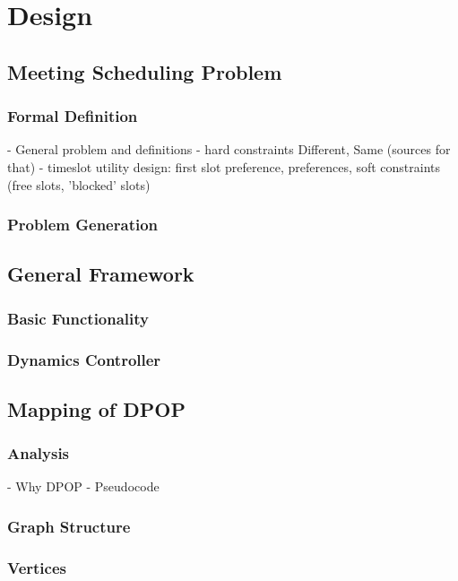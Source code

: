 \chapter{Design}

\section{Meeting Scheduling Problem}

\subsection{Formal Definition}

- General problem and definitions
- hard constraints Different, Same (sources for that)
- timeslot utility design: first slot preference, preferences, soft constraints (free slots, 'blocked' slots)

\subsection{Problem Generation}

\section{General Framework}
\subsection{Basic Functionality}
\subsection{Dynamics Controller}

\section{Mapping of DPOP}
\subsection{Analysis}
    
    - Why DPOP
    - Pseudocode

\subsection{Graph Structure}
\subsection{Vertices}


